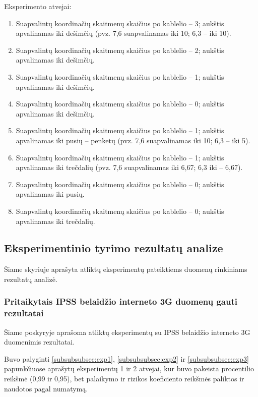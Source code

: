 \documentclass{VUMIFPSbakalaurinis}
\begin{document}
Eksperimento atvejai:
\begin{enumerate}
	\item Suapvalintų koordinačių skaitmenų skaičius po kablelio – 3; aukštis apvalinamas iki dešimčių (pvz. 7,6 suapvalinamas iki 10; 6,3 – iki 10).
	\item Suapvalintų koordinačių skaitmenų skaičius po kablelio – 2; aukštis apvalinamas iki dešimčių.
	\item Suapvalintų koordinačių skaitmenų skaičius po kablelio – 1; aukštis apvalinamas iki dešimčių.
	\item Suapvalintų koordinačių skaitmenų skaičius po kablelio – 0; aukštis apvalinamas iki dešimčių.
	\item Suapvalintų koordinačių skaitmenų skaičius po kablelio – 1; aukštis apvalinamas iki pusių – penketų (pvz. 7,6 suapvalinamas iki 10; 6,3 – iki 5).
	\item Suapvalintų koordinačių skaitmenų skaičius po kablelio – 1; aukštis apvalinamas iki trečdalių (pvz. 7,6 suapvalinamas iki 6,67; 6,3 iki – 6,67).
	\item Suapvalintų koordinačių skaitmenų skaičius po kablelio – 0; aukštis apvalinamas iki pusių.
	\item Suapvalintų koordinačių skaitmenų skaičius po kablelio – 0; aukštis apvalinamas iki trečdalių.
\end{enumerate}

 \label{subsubsubsec:exp5}

 \label{subsubsubsec:exp6}

\subsection{Eksperimentinio tyrimo rezultatų analize}
Šiame skyriuje aprašyta atliktų eksperimentų pateiktiems duomenų rinkiniams rezultatų analizė.

\subsubsection{Pritaikytais IPSS belaidžio interneto 3G duomenų gauti rezultatai}
Šiame poskyryje aprašoma atliktų eksperimentų su IPSS belaidžio interneto 3G duomenimis rezultatai.

Buvo palyginti \ref{subsubsubsec:exp1}, \ref{subsubsubsec:exp2} ir \ref{subsubsubsec:exp3} papunkčiuose aprašytų eksperimentų 1 ir 2 atvejai, kur buvo pakeista procentilio reikšmė (0,99 ir 0,95), bet palaikymo ir rizikos koeficiento reikšmės paliktos ir naudotos pagal numatymą.\par
\end{document}
